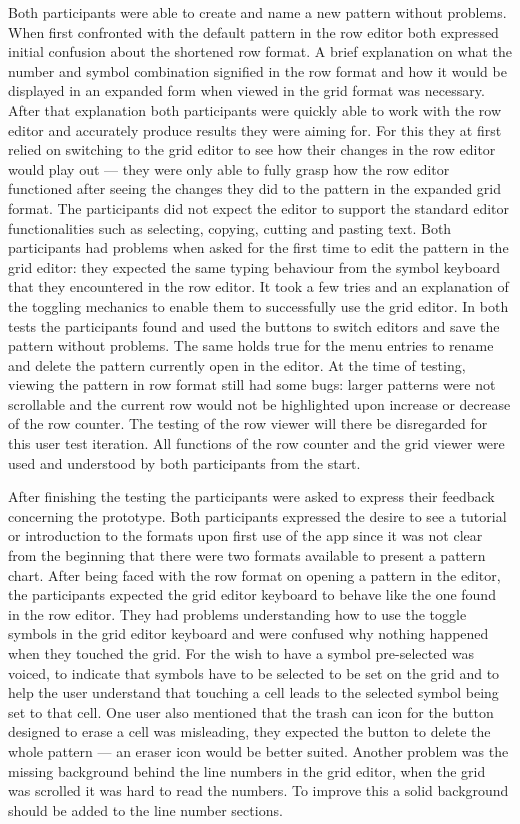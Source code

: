 Both participants were able to create and name a new pattern without problems. When first confronted with the default pattern in the row editor both expressed initial confusion about the shortened row format. A brief explanation on what the number and symbol combination signified in the row format and how it would be displayed in an expanded form when viewed in the grid format was necessary. After that explanation both participants were quickly able to work with the row editor and accurately produce results they were aiming for. For this they at first relied on switching to the grid editor to see how their changes in the row editor would play out --- they were only able to fully grasp how the row editor functioned after seeing the changes they did to the pattern in the expanded grid format. The participants did not expect the editor to support the standard editor functionalities such as selecting, copying, cutting and pasting text. 
Both participants had problems when asked for the first time to edit the pattern in the grid editor: they expected the same typing behaviour from the symbol keyboard that they encountered in the row editor. It took a few tries and an explanation of the toggling mechanics to enable them to successfully use the grid editor. In both tests the participants found and used the buttons to switch editors and save the pattern without problems. The same holds true for the menu entries to rename and delete the pattern currently open in the editor.
At the time of testing, viewing the pattern in row format still had some bugs: larger patterns were not scrollable and the current row would not be highlighted upon increase or decrease of the row counter. The testing of the row viewer will there be disregarded for this user test iteration. All functions of the row counter and the grid viewer were used and understood by both participants from the start. 

After finishing the testing the participants were asked to express their feedback concerning the prototype. Both participants expressed the desire to see a tutorial or introduction to the formats upon first use of the app since it was not clear from the beginning that there were two formats available to present a pattern chart. After being faced with the row format on opening a pattern in the editor, the participants expected the grid editor keyboard to behave like the one found in the row editor. They had problems understanding how to use the toggle symbols in the grid editor keyboard and were confused why nothing happened when they touched the grid. For the wish to have a symbol pre-selected was voiced, to indicate that symbols have to be selected to be set on the grid and to help the user understand that touching a cell leads to the selected symbol being set to that cell. One user also mentioned that the trash can icon for the button designed to erase a cell was misleading, they expected the button to delete the whole pattern --- an eraser icon would be better suited. Another problem was the missing background behind the line numbers in the grid editor, when the grid was scrolled it was hard to read the numbers. To improve this a solid background should be added to the line number sections. 

